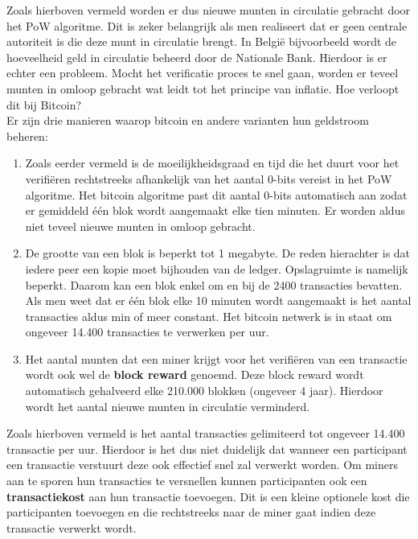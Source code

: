 Zoals hierboven vermeld worden er dus nieuwe munten in circulatie gebracht door het PoW algoritme. Dit is zeker belangrijk als men realiseert dat er geen centrale autoriteit is die deze munt in circulatie brengt. In België bijvoorbeeld wordt de hoeveelheid geld in circulatie beheerd door de Nationale Bank. Hierdoor is er echter een probleem. Mocht het verificatie proces te snel gaan, worden er teveel munten in omloop gebracht wat leidt tot het principe van inflatie. Hoe verloopt dit bij Bitcoin?\\

Er zijn drie manieren waarop bitcoin en andere varianten hun geldstroom beheren:

\begin{enumerate}

\item Zoals eerder vermeld is de moeilijkheidsgraad en tijd die het duurt voor het verifiëren rechtstreeks afhankelijk van het aantal 0-bits vereist in het PoW algoritme. Het bitcoin algoritme past dit aantal 0-bits automatisch aan zodat er gemiddeld één blok wordt aangemaakt elke tien minuten. Er worden aldus niet teveel nieuwe munten in omloop gebracht.\\

\item De grootte van een blok is beperkt tot 1 megabyte. De reden hierachter is dat iedere peer een kopie moet bijhouden van de ledger. Opslagruimte is namelijk beperkt. Daarom kan een blok enkel om en bij de 2400 transacties bevatten. Als men weet dat er één blok elke 10 minuten wordt aangemaakt is het aantal transacties aldus min of meer constant. Het bitcoin netwerk is in staat om ongeveer 14.400 transacties te verwerken per uur.\\

\item Het aantal munten dat een miner krijgt voor het verifiëren van een transactie wordt ook wel de \textbf{block reward} genoemd. Deze block reward wordt automatisch gehalveerd elke 210.000 blokken (ongeveer 4 jaar). Hierdoor wordt het aantal nieuwe munten in circulatie verminderd.\\
\end{enumerate}

Zoals hierboven vermeld is het aantal transacties gelimiteerd tot ongeveer 14.400 transactie per uur. Hierdoor is het dus niet duidelijk dat wanneer een participant een transactie verstuurt deze ook effectief snel zal verwerkt worden. Om miners aan te sporen hun transacties te versnellen kunnen participanten ook een \textbf{transactiekost} aan hun transactie toevoegen.  Dit is een kleine optionele kost die participanten toevoegen en die rechtstreeks naar de miner gaat indien deze transactie verwerkt wordt.


